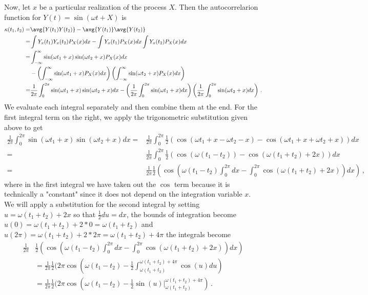 Now, let $x$ be a particular realization of the process $X$.
Then the autocorrelarion function for $Y(t) = \sin(\omega t + X)$ is
\begin{align*}
  \kappa(t_1 , t_2) = & \avg{Y(t_1) Y(t_2)} - \avg{Y(t_1)} \avg{Y(t_2)} \\
  = & \int Y_{x}(t_1)Y_{x}(t_2)P_{X}(x)dx - \int Y_{x}(t_1)P_{X}(x)dx \int Y_{x}(t_2)P_{X}(x)dx \\
  = &  \int_{-\infty}^{\infty}\sin(\omega t_1 + x) \sin(\omega t_2 + x)  P_{X}(x)dx \\
  &- \left( \int_{-\infty}^{\infty}\sin(\omega t_1 + x)P_{X}(x)dx \right) \left( \int_{-\infty}^{\infty}\sin(\omega t_2 + x) P_{X}(x)dx \right) \\
  = & \frac{1}{2\pi}\int_{0}^{2\pi}\sin(\omega t_1 + x) \sin(\omega t_2 + x)dx
  - \left(\frac{1}{2\pi}\int_{0}^{2\pi}\sin(\omega t_1 + x)dx \right) \left( \frac{1}{2\pi}\int_{0}^{2\pi}\sin(\omega t_2 + x)dx \right)
  \, .
\end{align*}
We evaluate each integral separately and then combine them at the end.
For the first integral term on the right, we apply the trigonometric substitution given above to get
\begin{align*}
  \frac{1}{2\pi}\int_{0}^{2\pi}\sin(\omega t_1 + x) \sin(\omega t_2 + x)dx = &  \frac{1}{2\pi}\int_{0}^{2\pi} \frac{1}{2} (\cos(\omega t_1 + x - \omega t_2 - x) - \cos(\omega t_1 + x + \omega t_2 + x )) dx \\
  = & \frac{1}{2\pi}\int_{0}^{2\pi} \frac{1}{2} ( \cos(\omega(t_1 - t_2 ) ) - \cos(\omega(t_1 + t_2 ) + 2x) )dx \\
  = & \frac{1}{2\pi} \frac{1}{2} ( \cos(\omega(t_1 - t_2 ) \int_{0}^{2\pi} dx - \int_{0}^{2\pi} \cos(\omega(t_1 + t_2 ) + 2x) )dx )
  \, ,
\end{align*}
where in the first integral we have taken out the $\cos$ term because it is technically a "constant" since it does not depend on the integration variable $x$.
We will apply a substitution for the second integral by setting $u = \omega(t_1 + t_2) + 2x$ so that $\frac{1}{2} du = dx$, the bounds of integration become $u(0) = \omega(t_1 + t_2) + 2*0 = \omega(t_1 + t_2)$ and $u(2\pi) = \omega(t_1 + t_2) + 2*2\pi = \omega(t_1 + t_2) + 4\pi$ the integrals become
\begin{align*}
  \frac{1}{2\pi} & \frac{1}{2} ( \cos(\omega(t_1 - t_2 ) \int_{0}^{2\pi} dx - \int_{0}^{2\pi} \cos(\omega(t_1 + t_2 ) + 2x) )dx ) \\
  & = \frac{1}{2\pi} \frac{1}{2} ( 2\pi \cos(\omega(t_1 - t_2 ) - \frac{1}{2}\int_{\omega(t_1 + t_2)}^{ \omega(t_1 + t_2) + 4\pi}\cos(u) du ) \\
  & = \frac{1}{2\pi} \frac{1}{2} ( 2\pi \cos(\omega(t_1 - t_2 ) - \frac{1}{2} \left. \sin(u)  \right|_{\omega(t_1 + t_2)}^{\omega(t_1 + t_2) + 4\pi} )
  \, .
\end{align*}
